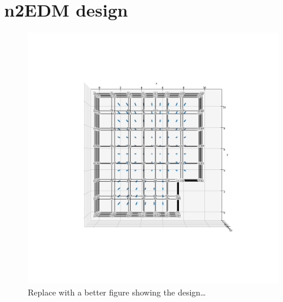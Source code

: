 



\section{n2EDM design}

\begin{figure}
  \centering
  \includegraphics[width=\linewidth]{gfx/prototype/n2EDM_system_top.png}
  \caption{Replace with a better figure showing the design\ldots}\label{fig:n2EDM_design_top}
\end{figure}

